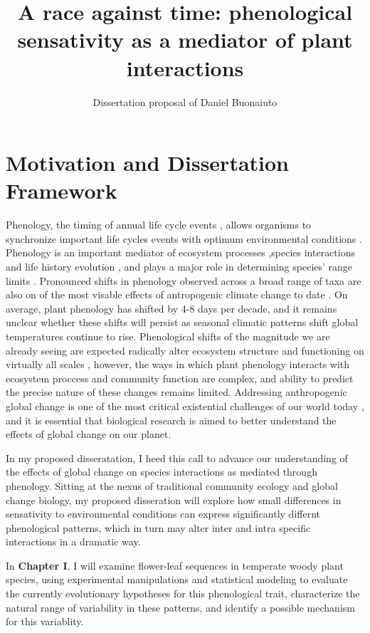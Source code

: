 \documentclass{article}\usepackage[]{graphicx}\usepackage[]{color}
\begin{document}
\title{A race against time: phenological sensativity as a mediator of plant interactions}
\author{Dissertation proposal of Daniel Buonaiuto}
\maketitle{}
\section*{Motivation and Dissertation Framework}
\par Phenology, the timing of annual life cycle events \citep{}, allows organisms to synchronize important life cycles events with optimum environmental conditions \citep{}. Phenology is an important mediator of ecosystem processes \citep{},species interactions \citep*{} and life history evolution \citep{}, and plays a major role in determining species' range limits \citep{}. Pronounced shifts in phenology observed across a broad range of taxa are also on of the most visable effects of antropogenic climate change to date \citep{}. On average, plant phenology has shifted by 4-8 days per decade, and it remains unclear whether these shifts will persist as seasonal climatic patterns shift global temperatures continue to rise. Phenological shifts of the magnitude we are already seeing are expected radically alter ecosystem structure and functioning on virtually all scales \citep*{}, however, the ways in which plant phenology interacts with ecosystem proccess and community function are complex, and ability to predict the precise nature of these changes remains limited. Addressing anthropogenic global change is one of the most critical existential challenges of our world today \citep{}, and it is essential that biological research is aimed to better understand the effects of global change on our planet.\\
\par In my proposed disseratation, I heed this call to advance our understanding of the effects of global change on species interactions as mediated through phenology. Sitting at the nexus of traditional community ecology and global change biology, my proposed disseration will explore how small differences in sensativity to environmental conditions can express significantly differnt phenological patterns, which in turn may alter inter and intra specific interactions in a dramatic way.\\
\par In \textbf{Chapter I}, I will examine flower-leaf sequences in temperate woody plant species, using experimental manipulations and statistical modeling to evaluate the currently evolutionary hypotheses for this phenological trait, characterize the natural range of variability in these patterns, and identify a possible mechanism for this variablity.\\
\end{document}
